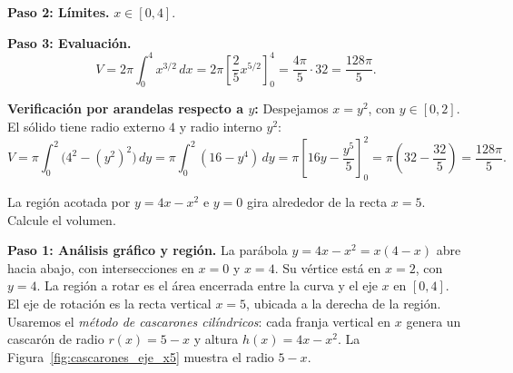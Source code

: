 \begin{example}
\begin{myproof}
\textbf{Paso 2: Límites.} $x\in[0,4]$.

\textbf{Paso 3: Evaluación.}
\[
  V = 2\pi\int_0^4 x^{3/2}\,dx
    = 2\pi\left[\frac{2}{5}x^{5/2}\right]_0^4
    = \frac{4\pi}{5}\cdot 32
    = \boxed{\dfrac{128\pi}{5}}.
\]

\textbf{Verificación por arandelas respecto a $y$:}
Despejamos $x=y^2$, con $y\in[0,2]$. El sólido tiene radio externo $4$ y
radio interno $y^2$:
\[
  V = \pi\int_0^2\bigl(4^2-(y^2)^2\bigr)\,dy
    = \pi\int_0^2(16-y^4)\,dy
    = \pi\left[16y-\frac{y^5}{5}\right]_0^2
    = \pi\!\left(32-\frac{32}{5}\right)
    = \frac{128\pi}{5}.
\]
\end{myproof}
\end{example}

\begin{example}
La región acotada por $y=4x-x^2$ e $y=0$ gira alrededor de la recta
$x=5$. Calcule el volumen.

\begin{myproof}
\textbf{Paso 1: Análisis gráfico y región.}
La parábola $y=4x-x^2=x(4-x)$ abre hacia abajo, con intersecciones en $x=0$ y $x=4$.
Su vértice está en $x=2$, con $y=4$. La región a rotar es el área encerrada entre
la curva y el eje $x$ en $[0,4]$. El eje de rotación es la recta vertical $x=5$,
ubicada a la derecha de la región. Usaremos el \emph{método de cascarones cilíndricos}:
cada franja vertical en $x$ genera un cascarón de radio $r(x)=5-x$ y altura $h(x)=4x-x^2$.
La Figura~\ref{fig:cascarones_eje_x5} muestra el radio $5-x$.


\end{myproof}
\end{example}
